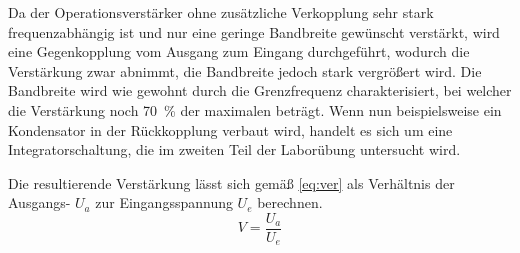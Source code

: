 Da der Operationsverstärker ohne zusätzliche Verkopplung sehr stark frequenzabhängig ist und 
nur eine geringe Bandbreite gewünscht verstärkt, wird eine Gegenkopplung vom Ausgang zum Eingang 
durchgeführt, wodurch die Verstärkung zwar abnimmt, die Bandbreite jedoch stark vergrößert wird. 
Die Bandbreite wird wie gewohnt durch die Grenzfrequenz charakterisiert, bei welcher die Verstärkung 
noch \SI{70}{\%} der maximalen beträgt. Wenn nun beispielsweise ein Kondensator in der Rückkopplung verbaut wird, 
handelt es sich um eine Integratorschaltung, die im zweiten Teil der Laborübung untersucht wird.

Die resultierende Verstärkung lässt sich gemäß \autoref{eq:ver} als Verhältnis der Ausgangs- $U_a$ zur Eingangsspannung $U_e$ berechnen.
\begin{equation}
	V=\frac{U_a}{U_e}
	\label{eq:ver}
\end{equation}
